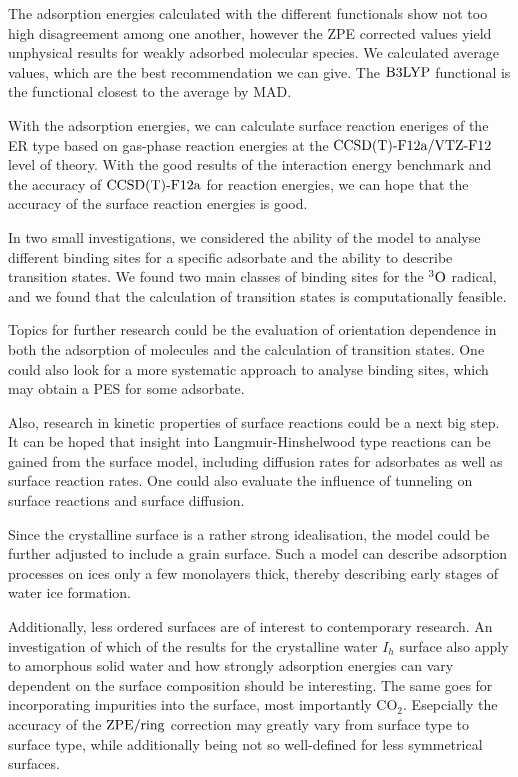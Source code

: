 \documentclass[8.5pt,twoside,twocolumn]{article}
\newcommand\zpe{\enmat{\te{ZPE}}}
\newcommand\zpering{\enmat{\zpe/\te{ring}}}
\newcommand\tripo{\enmat{{^3\te{O}}}}
\theoremstyle{standard}
\begin{document}
The adsorption energies calculated with the different functionals show not too
high disagreement among one another, however the ZPE corrected values yield
unphysical results for weakly adsorbed molecular species. We calculated average
values, which are the best recommendation we can give. The $\text{B3LYP}$ functional
is the functional closest to the average by MAD.

With the adsorption energies, we can calculate surface reaction eneriges of the
ER type based on gas-phase reaction energies at the $\text{CCSD(T)-F12a}/\text{VTZ-F}12$ level of
theory. With the good results of the interaction energy benchmark and the
accuracy of $\text{CCSD(T)-F12a}$ for reaction energies, we can hope that the accuracy of
the surface reaction energies is good.

In two small investigations, we considered the
ability of the model to analyse different binding sites for a specific adsorbate
and the ability to describe transition states. We found two main classes of
binding sites for the $\tripo$ radical, and we found that the calculation of
transition states is computationally feasible.

Topics for further research could be the evaluation of orientation dependence
in both the adsorption of molecules and the calculation of transition states.
One could also look for a more systematic approach to analyse binding sites,
which may obtain a PES for some adsorbate.

Also, research in kinetic properties of surface reactions could be a next big
step. It can be hoped that insight into Langmuir-Hinshelwood type reactions can
be gained from the surface model, including diffusion rates for adsorbates as
well as surface reaction rates. One could also evaluate the influence of
tunneling on surface reactions and surface diffusion.

Since the crystalline surface is a rather strong idealisation, the model could
be further adjusted to include a grain surface. Such a model can describe
adsorption processes on ices only a few monolayers thick, thereby describing
early stages of water ice formation.

Additionally, less ordered surfaces are of interest to contemporary research. An
investigation of which of the results for the crystalline water $I_h$ surface
also apply to amorphous solid water and how strongly adsorption energies can
vary dependent on the surface composition should be interesting. The same goes
for incorporating impurities into the surface, most importantly CO$_2$.
Esepcially the accuracy of the $\zpering$ correction may greatly vary from surface type to
surface type, while additionally being not so well-defined for less symmetrical
surfaces.
\end{document}
